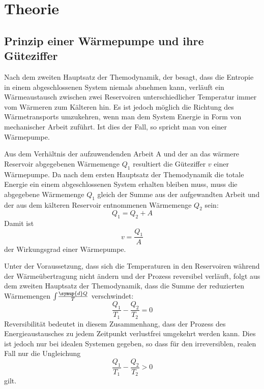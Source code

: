 \section{Theorie}
\label{sec:Theorie}
  \subsection{Prinzip einer Wärmepumpe und ihre Güteziffer}
  Nach dem zweiten Hauptsatz der Themodynamik, der besagt, dass die Entropie in
  einem abgeschlossenen System niemals abnehmen kann, verläuft ein Wärmeaustausch
  zwischen zwei Reservoiren unterschiedlicher Temperatur immer vom Wärmeren zum
  Kälteren hin.
  Es ist jedoch möglich die Richtung des Wärmetransports umzukehren, wenn man
  dem System Energie in Form von mechanischer Arbeit zuführt. Ist dies der Fall,
  so spricht man von einer Wärmepumpe.

  Aus dem Verhältnis der aufzuwendenden Arbeit A und der an das wärmere Reservoir
  abgegebenen Wärmemenge $Q_1$ resultiert die Güteziffer $v$ einer Wärmepumpe.
  Da nach dem ersten Hauptsatz der Themodynamik die totale Energie ein einem
  abgeschlossenen System erhalten bleiben muss, muss die abgegebene Wärmemenge
  $Q_1$ gleich der Summe aus der aufgewandten Arbeit und der aus dem kälteren
  Reservoir entnommenen Wärmemenge $Q_2$ sein:
  \begin{equation}
    Q_1 = Q_2 + A
    \label{eqn:gl1}
  \end{equation}
  Damit ist
  \begin{equation}
    v = \frac{Q_1}{A}
    \label{eqn:gueteziffer1}
  \end{equation}
  der Wirkungsgrad einer Wärmepumpe.

  Unter der Voraussetzung, dass sich die Temperaturen in den Reservoiren während
  der Wärmeübertragung nicht ändern und der Prozess reversibel verläuft, folgt
  aus dem zweiten Hauptsatz der Themodynamik, dass die Summe der reduzierten
  Wärmemengen $\int \! \frac{\symup{d}Q}{T}$ verschwindet:
  \begin{equation}
    \frac{Q_1}{T_1} - \frac{Q_2}{T_2} = 0
    \label{eqn:gl3}
  \end{equation}
  Reversibilität bedeutet in diesem Zusammenhang, dass der Prozess des
  Energieaustausches zu jedem Zeitpunkt verlustfrei umgekehrt werden kann.
  Dies ist jedoch nur bei idealen Systemen gegeben, so dass für den irreversiblen,
  realen Fall nur die Ungleichung
  \begin{equation}
    \frac{Q_1}{T_1} - \frac{Q_2}{T_2} > 0
    \label{eqn:gl4}
  \end{equation}
  gilt.

